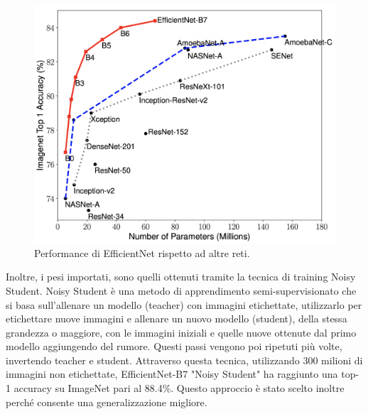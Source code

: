         \begin{figure}[H]
            \centering
            \includegraphics[scale=0.15]{Plot/efficientnet.png}
            \caption{Performance di EfficientNet rispetto ad altre reti.}
            \label{fig:efficientnet}
        \end{figure}
        
        Inoltre, i pesi importati, sono quelli ottenuti tramite la tecnica di training Noisy Student. Noisy Student è una metodo di apprendimento semi-supervisionato che si basa sull'allenare un modello (teacher) con immagini etichettate, utilizzarlo per etichettare nuove immagini e allenare un nuovo modello (student), della stessa grandezza o maggiore, con le immagini iniziali e quelle nuove ottenute dal primo modello aggiungendo del rumore. Questi passi vengono poi ripetuti più volte, invertendo teacher e student. Attraverso questa tecnica, utilizzando 300 milioni di immagini non etichettate, EfficientNet-B7 "Noisy Student" ha raggiunto una top-1 accuracy su ImageNet pari al 88.4\%. Questo approccio è stato scelto inoltre perché consente una generalizzazione migliore. \cite{xie2020selftraining}

